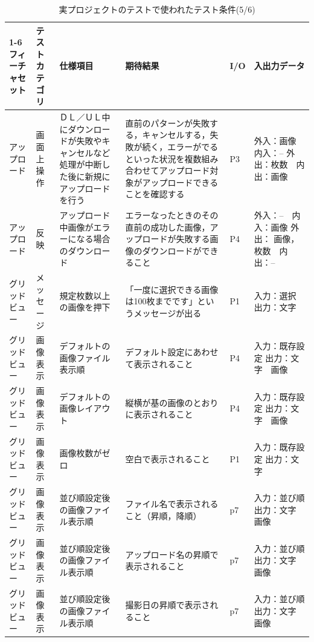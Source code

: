 \begin{table}[htbp]
  \scriptsize
  \centering
  \caption{実プロジェクトのテストで使われたテスト条件(5/6)}
  \begin{tabular}{|p{8em}|p{7em}|p{9em}|p{9em}|p{3em}|p{12em}|}
\cline{1-6}   フィーチャセット & テストカテゴリ  & 仕様項目 & 期待結果  & I/O   & 入出力データ \bigstrut\\
    \hline
    \hline
    アップロード & 画面上操作 & \multicolumn{1}{p{8em}|}{ＤＬ／ＵＬ中にダウンロードが失敗やキャンセルなど処理が中断した後に新規にアップロードを行う} & 直前のパターンが失敗する，キャンセルする，失敗が続く，エラーがでるといった状況を複数組み合わせてアップロード対象がアップロードできることを確認する & P3    & 外入：画像　内入：--
外出：枚数　内出：画像 \bigstrut\\
    \hline
    アップロード & 反映    & \multicolumn{1}{p{8em}|}{アップロード中画像がエラーになる場合のダウンロード} & エラーなったときのその直前の成功した画像，アップロードが失敗する画像のダウンロードができること & P4    & 外入：--　内入：画像
外出： 画像，枚数　内出：-- \bigstrut\\
    \hline
    グリッドビュー & メッセージ & \multicolumn{1}{p{8em}|}{規定枚数以上の画像を押下} & 「一度に選択できる画像は100枚までです」というメッセージが出る & P1    & 入力：選択
出力：文字 \bigstrut\\
    \hline
    グリッドビュー & 画像表示  & デフォルトの画像ファイル表示順 & デフォルト設定にあわせて表示されること & P4    & 入力：既存設定
出力：文字　画像 \bigstrut\\
    \hline
    グリッドビュー & 画像表示  & デフォルトの画像レイアウト & 縦横が基の画像のとおりに表示されること & P4    & 入力：既存設定
出力：文字　画像 \bigstrut\\
    \hline
    グリッドビュー & 画像表示  & 画像枚数がゼロ & 空白で表示されること & P1    & 入力：既存設定
出力：文字 \bigstrut\\
    \hline
    グリッドビュー & 画像表示  & 並び順設定後の画像ファイル表示順 & ファイル名で表示されること（昇順，降順） & p7    & 入力：並び順
出力：文字　画像 \bigstrut\\
    \hline
    グリッドビュー & 画像表示  & 並び順設定後の画像ファイル表示順 & アップロード名の昇順で表示されること & p7    & 入力：並び順
出力：文字　画像 \bigstrut\\
    \hline
    グリッドビュー & 画像表示  & 並び順設定後の画像ファイル表示順 & 撮影日の昇順で表示されること & p7    & 入力：並び順
出力：文字　画像 \bigstrut\\
    \hline

\end{tabular}
\end{table}
